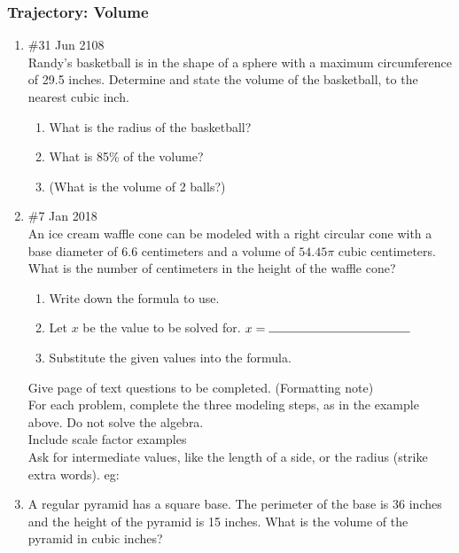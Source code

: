 \documentclass[12pt, twoside]{article}
\begin{document}
\subsubsection*{Trajectory: Volume}
  \begin{enumerate}

    \item \#31 Jun 2108\\
    Randy’s basketball is in the shape of a sphere with a maximum circumference of 29.5 inches. Determine and state the volume of the basketball, to the nearest cubic inch.
      \begin{enumerate}
        \item What is the radius of the basketball? \vspace{2cm}
        \item What is 85\% of the volume? \vspace{2cm}
        \item (What is the volume of 2 balls?) \vspace{2cm}
      \end{enumerate}

    \item \#7 Jan 2018\\
    An ice cream waffle cone can be modeled with a right circular
    cone with a base diameter of 6.6 centimeters and a volume of $54.45 \pi$ cubic centimeters. What is the number of centimeters in the height of the waffle cone?
      \begin{enumerate}
        \item Write down the formula to use.
        \item Let $x$ be the value to be solved for. $x= \rule{4cm}{0.15mm}$
        \item Substitute the given values into the formula.
      \end{enumerate}

    Give page of text questions to be completed. (Formatting note)\\
    For each problem, complete the three modeling steps, as in the example above. Do not solve the algebra.\\
    Include scale factor examples\\
    Ask for intermediate values, like the length of a side, or the radius (strike extra words). eg:
    \item A regular pyramid has a square base. The perimeter of the base is 36 inches and the height of the pyramid is 15 inches. What is the volume of the pyramid in cubic inches?


  \end{enumerate}
\end{document}
